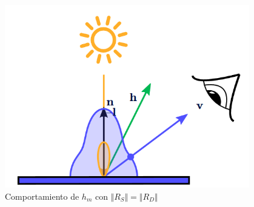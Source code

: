 \begin{figure}[!h]
\begin{minipage}[c]{0.32\linewidth}
        \includegraphics[width=0.95\textwidth, align=b]{Plantilla-TFG-master/img/phong3.png}
     \end{minipage}
     \caption{Comportamiento de  $h_m$ con $\Vert R_S\Vert =\Vert R_D\Vert$}
     \label{fig:phong}
\end{figure}

